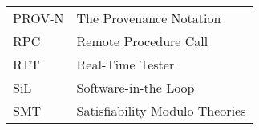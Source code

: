 \begin{longtable}{ll}
PROV-N  &The Provenance Notation\\
RPC     &Remote Procedure Call\\
RTT & Real-Time Tester\\
SiL	& Software-in-the Loop\\
SMT & Satisfiability Modulo Theories \\

\end{longtable}
